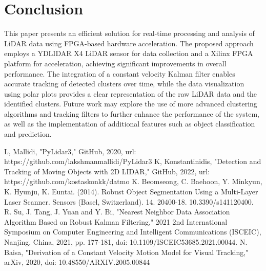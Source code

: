 \documentclass[journal]{IEEEtran} %
\begin{document}
\section{Conclusion}

This paper presents an efficient solution for real-time processing and analysis of LiDAR data using FPGA-based hardware acceleration. The proposed approach employs a YDLIDAR X4 LiDAR sensor for data collection and a Xilinx FPGA platform for acceleration, achieving significant improvements in overall performance. The integration of a constant velocity Kalman filter enables accurate tracking of detected clusters over time, while the data visualization using polar plots provides a clear representation of the raw LiDAR data and the identified clusters. Future work may explore the use of more advanced clustering algorithms and tracking filters to further enhance the performance of the system, as well as the implementation of additional features such as object classification and prediction.

\begin{thebibliography}{00}
     L, Mallidi, "PyLidar3," GitHub, 2020, url: https://github.com/lakshmanmallidi/PyLidar3
     K, Konstantinidis, "Detection and Tracking of Moving Objects with 2D LIDAR," GitHub, 2022, url: https://github.com/kostaskonkk/datmo
     K. Beomseong, C. Baehoon, Y. Minkyun, K. Hyunju, K. Euntai. (2014). Robust Object Segmentation Using a Multi-Layer Laser Scanner. Sensors (Basel, Switzerland). 14. 20400-18. 10.3390/s141120400. 
     R. Su, J. Tang, J. Yuan and Y. Bi, "Nearest Neighbor Data Association Algorithm Based on Robust Kalman Filtering," 2021 2nd International Symposium on Computer Engineering and Intelligent Communications (ISCEIC), Nanjing, China, 2021, pp. 177-181, doi: 10.1109/ISCEIC53685.2021.00044.
     N. Baisa, "Derivation of a Constant Velocity Motion Model for Visual Tracking," arXiv, 2020, doi: 10.48550/ARXIV.2005.00844

\end{thebibliography}
\end{document}
